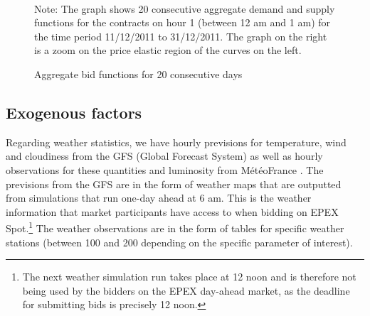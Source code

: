 \begin{figure}[!ht]
\vspace{0.3cm}
\begin{center}\\
\vspace{0.05cm}
\caption{Aggregate bid functions for 20 consecutive days}
\label{graphmultifunc}
\end{center}
{\small Note: The graph shows 20 consecutive aggregate demand and supply functions for the contracts on hour 1 (between 12 am and 1 am) for the time period 11/12/2011 to 31/12/2011. The graph on the right is a zoom on the price elastic region of the curves on the left.}
\end{figure}

\begin{center}

\end{center}


\subsection*{Exogenous factors}
Regarding weather statistics, we have hourly previsions for temperature, wind and cloudiness from the GFS (Global Forecast System) as well as hourly observations for these quantities and luminosity from M\'{e}t\'{e}oFrance
. The previsions from the GFS are in the form of weather maps that are outputted from simulations that run one-day ahead at 6 am. This is the weather information that market participants have access to when bidding on EPEX Spot.\footnote{The next weather simulation run takes place at 12 noon and is therefore not being used by the bidders on the EPEX day-ahead market, as the deadline for submitting bids is precisely 12 noon.} The weather observations are in the form of tables for specific weather stations (between 100 and 200 depending on the specific parameter of interest).\\

